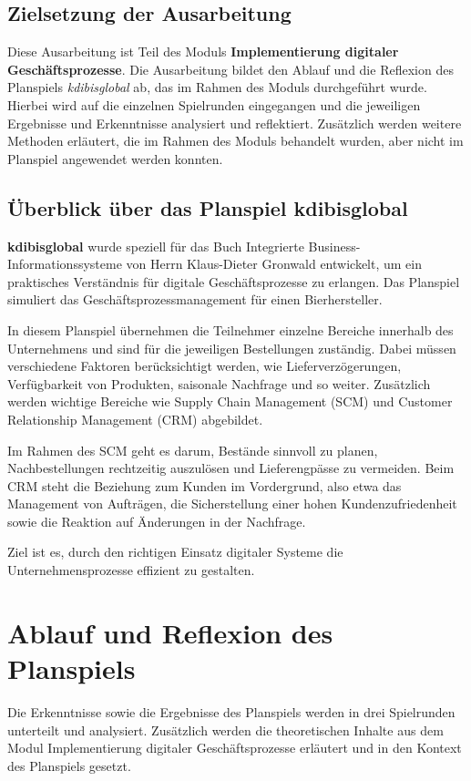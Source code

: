 \documentclass[a4paper,12pt]{article}
\begin{document}
\subsection{Zielsetzung der Ausarbeitung}
Diese Ausarbeitung ist Teil des Moduls \textbf{Implementierung digitaler Geschäftsprozesse}.
Die Ausarbeitung bildet den Ablauf und die Reflexion des Planspiels \textit{kdibisglobal} ab,
das im Rahmen des Moduls durchgeführt wurde.
Hierbei wird auf die einzelnen Spielrunden eingegangen
und die jeweiligen Ergebnisse und Erkenntnisse analysiert und reflektiert.
Zusätzlich werden weitere Methoden
erläutert, die im Rahmen des Moduls behandelt wurden, aber nicht im Planspiel angewendet werden konnten.

\subsection{Überblick über das Planspiel kdibisglobal}
\textbf{kdibisglobal} wurde speziell für das Buch Integrierte Business-Informationssysteme von Herrn Klaus-Dieter Gronwald entwickelt,
um ein praktisches Verständnis für digitale Geschäftsprozesse zu erlangen.
Das Planspiel simuliert das Geschäftsprozessmanagement für einen Bierhersteller.

In diesem Planspiel übernehmen die Teilnehmer einzelne Bereiche innerhalb des Unternehmens und sind für die jeweiligen Bestellungen zuständig.
Dabei müssen verschiedene Faktoren berücksichtigt werden, wie Lieferverzögerungen, Verfügbarkeit von Produkten, saisonale Nachfrage und so weiter.
Zusätzlich werden wichtige Bereiche wie Supply Chain Management (SCM) und Customer Relationship Management (CRM) abgebildet.

Im Rahmen des SCM geht es darum, Bestände sinnvoll zu planen, Nachbestellungen rechtzeitig auszulösen und Lieferengpässe zu vermeiden.
Beim CRM steht die Beziehung zum Kunden im Vordergrund, also etwa das Management von Aufträgen,
die Sicherstellung einer hohen Kundenzufriedenheit sowie die Reaktion auf Änderungen in der Nachfrage.

Ziel ist es, durch den richtigen Einsatz digitaler Systeme die Unternehmensprozesse effizient zu gestalten.\cite{Kdibisglobal2025}

\section{Ablauf und Reflexion des Planspiels}
Die Erkenntnisse sowie die Ergebnisse des Planspiels werden in drei Spielrunden unterteilt und analysiert.
Zusätzlich werden die theoretischen Inhalte aus dem Modul Implementierung digitaler Geschäftsprozesse erläutert und
in den Kontext des Planspiels gesetzt.
\end{document}
